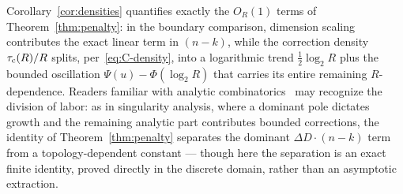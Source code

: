 \begin{remark}\label{rem:penalty-analogy}
	Corollary~\ref{cor:densities} quantifies exactly the $O_R(1)$ terms of
	Theorem~\ref{thm:penalty}: in the boundary comparison, dimension scaling
	contributes the exact linear term in $(n-k)$, while the correction density
	$\tau_{\mathrm{c}}(R)/R$ splits, per~\eqref{eq:C-density}, into a logarithmic trend
	$\tfrac{1}{2}\log_2 R$ plus the bounded oscillation $\Psi(u) -
	\Phi(\log_2 R)$ that carries its entire remaining $R$-dependence.
	Readers
	familiar with analytic
	combinatorics~\cite{wilf2006generatingfunctionology} may recognize the
	division of labor: as in singularity analysis, where a dominant pole
	dictates growth and the remaining analytic part contributes bounded
	corrections, the identity of Theorem~\ref{thm:penalty} separates the
	dominant $\Delta D \cdot (n-k)$ term from a topology-dependent constant
	--- though here the separation is an exact finite identity, proved
	directly in the discrete domain, rather than an asymptotic extraction.
\end{remark}
